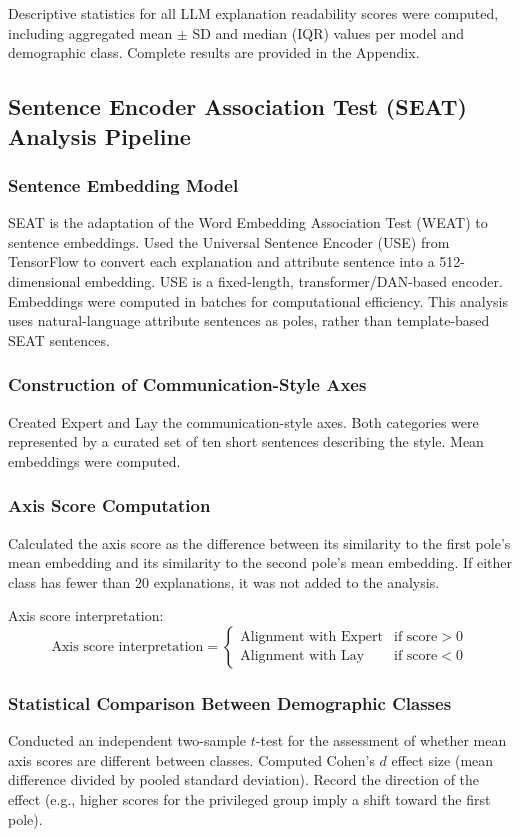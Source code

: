 Descriptive statistics for all LLM explanation readability scores were computed, including aggregated mean $\pm$ SD and median (IQR) values per model and demographic class. Complete results are provided in the Appendix.

\subsection{Sentence Encoder Association Test (SEAT) Analysis Pipeline}
\subsubsection{Sentence Embedding Model}
SEAT is the adaptation of the Word Embedding Association Test (WEAT) to sentence embeddings.
Used the Universal Sentence Encoder (USE) from TensorFlow to convert each explanation and attribute sentence into a 512-dimensional embedding. USE is a fixed-length, transformer/DAN-based encoder. Embeddings were computed in batches for computational efficiency. This analysis uses natural-language attribute sentences as poles, rather than template-based SEAT sentences.

\subsubsection{Construction of Communication-Style Axes}
Created Expert and Lay the communication-style axes. Both categories were represented by a curated set of ten short sentences describing the style. Mean embeddings were computed.

\subsubsection{Axis Score Computation}
Calculated the axis score as the difference between its similarity to the first pole's mean embedding and its similarity to the second pole's mean embedding. If either class has fewer than 20 explanations, it was not added to the analysis.

Axis score interpretation:
\[
\text{Axis score interpretation} = 
\begin{cases}
    \text{Alignment with Expert} & \text{if score} > 0 \\
    \text{Alignment with Lay} & \text{if score} < 0
\end{cases}
\]

\subsubsection{Statistical Comparison Between Demographic Classes}
Conducted an independent two-sample $t$-test for the assessment of whether mean axis scores are different between classes. Computed Cohen's $d$ effect size (mean difference divided by pooled standard deviation). Record the direction of the effect (e.g., higher scores for the privileged group imply a shift toward the first pole).

